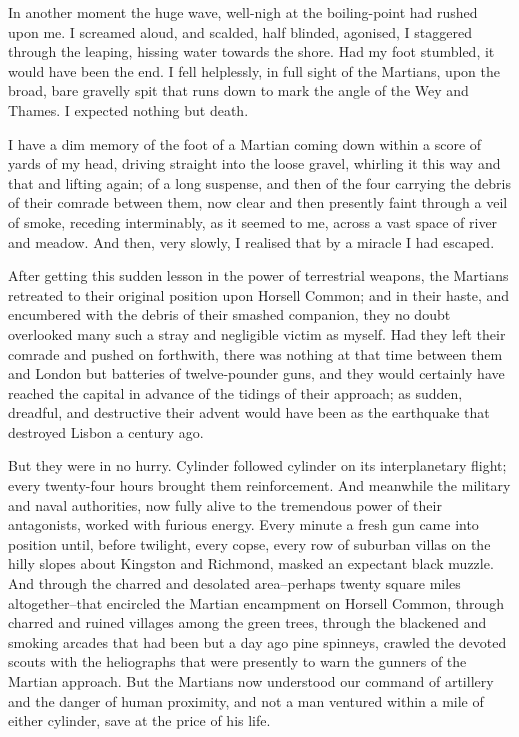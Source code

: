 In another moment the huge wave, well-nigh at the boiling-point had
rushed upon me. I screamed aloud, and scalded, half blinded,
agonised, I staggered through the leaping, hissing water towards
the shore. Had my foot stumbled, it would have been the end. I fell
helplessly, in full sight of the Martians, upon the broad, bare
gravelly spit that runs down to mark the angle of the Wey and
Thames. I expected nothing but death.

I have a dim memory of the foot of a Martian coming down within a
score of yards of my head, driving straight into the loose gravel,
whirling it this way and that and lifting again; of a long
suspense, and then of the four carrying the debris of their comrade
between them, now clear and then presently faint through a veil of
smoke, receding interminably, as it seemed to me, across a vast
space of river and meadow. And then, very slowly, I realised that
by a miracle I had escaped.

After getting this sudden lesson in the power of terrestrial
weapons, the Martians retreated to their original position upon
Horsell Common; and in their haste, and encumbered with the debris
of their smashed companion, they no doubt overlooked many such a
stray and negligible victim as myself. Had they left their comrade
and pushed on forthwith, there was nothing at that time between
them and London but batteries of twelve-pounder guns, and they
would certainly have reached the capital in advance of the tidings
of their approach; as sudden, dreadful, and destructive their
advent would have been as the earthquake that destroyed Lisbon a
century ago.

But they were in no hurry. Cylinder followed cylinder on its
interplanetary flight; every twenty-four hours brought them
reinforcement. And meanwhile the military and naval authorities,
now fully alive to the tremendous power of their antagonists,
worked with furious energy. Every minute a fresh gun came into
position until, before twilight, every copse, every row of suburban
villas on the hilly slopes about Kingston and Richmond, masked an
expectant black muzzle. And through the charred and desolated
area--perhaps twenty square miles altogether--that encircled the
Martian encampment on Horsell Common, through charred and ruined
villages among the green trees, through the blackened and smoking
arcades that had been but a day ago pine spinneys, crawled the
devoted scouts with the heliographs that were presently to warn the
gunners of the Martian approach. But the Martians now understood
our command of artillery and the danger of human proximity, and not
a man ventured within a mile of either cylinder, save at the price
of his life.

